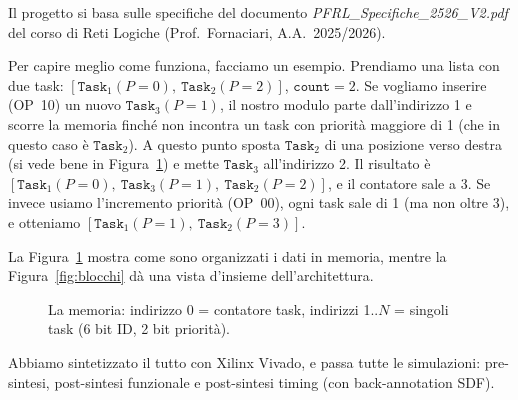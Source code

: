 \documentclass[a4paper,12pt]{article}
\begin{document}
Il progetto si basa sulle specifiche del documento \emph{PFRL\_Specifiche\_2526\_V2.pdf} del corso di Reti Logiche (Prof.~Fornaciari, A.A.~2025/2026).

Per capire meglio come funziona, facciamo un esempio. Prendiamo una lista con due task: $[\texttt{Task}_1(P=0),\ \texttt{Task}_2(P=2)]$, $\texttt{count}=2$. Se vogliamo inserire (OP~10) un nuovo $\texttt{Task}_3(P=1)$, il nostro modulo parte dall'indirizzo 1 e scorre la memoria finché non incontra un task con priorità maggiore di 1 (che in questo caso è $\texttt{Task}_2$). A questo punto sposta $\texttt{Task}_2$ di una posizione verso destra (si vede bene in Figura~\ref{fig:mem_struct}) e mette $\texttt{Task}_3$ all'indirizzo 2. Il risultato è $[\texttt{Task}_1(P=0),\ \texttt{Task}_3(P=1),\ \texttt{Task}_2(P=2)]$, e il contatore sale a 3. Se invece usiamo l'incremento priorità (OP~00), ogni task sale di 1 (ma non oltre 3), e otteniamo $[\texttt{Task}_1(P=1),\ \texttt{Task}_2(P=3)]$.

La Figura~\ref{fig:mem_struct} mostra come sono organizzati i dati in memoria, mentre la Figura~\ref{fig:blocchi} dà una vista d'insieme dell'architettura.

\begin{figure}[H]
\centering
{}
\caption{La memoria: indirizzo 0 = contatore task, indirizzi 1..$N$ = singoli task (6 bit ID, 2 bit priorità).}
\label{fig:mem_struct}
\end{figure}

Abbiamo sintetizzato il tutto con Xilinx Vivado, e passa tutte le simulazioni: pre-sintesi, post-sintesi funzionale e post-sintesi timing (con back-annotation SDF).
\end{document}
